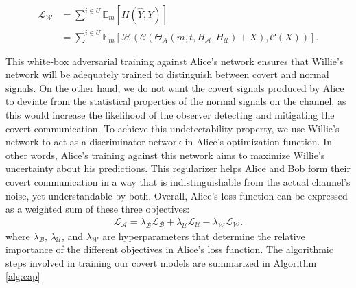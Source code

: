\begin{equation}
	\begin{aligned} \label{multi_willie_loss}
		\mathcal{L}_{\mathcal{W}} & = 
		\sum^{i \in U} \mathbb{E}_{m}[H(\hat{Y}, Y)] \\
		& = \sum^{i \in U}
			\mathbb{E}_{m}[\mathcal{H}(\mathcal{C}(\Theta_{\mathcal{A}}(m, t, H_{\mathcal{A}}, H_{\mathcal{U}}) + X), \mathcal{C}(X))].
	\end{aligned}
\end{equation}

This white-box adversarial training against Alice's network ensures that Willie's network will be adequately trained to distinguish between covert and normal signals. On the other hand, we do not want the covert signals produced by Alice to deviate from the statistical properties of the normal signals on the channel, as this would increase the likelihood of the observer detecting and mitigating the covert communication. To achieve this undetectability property, we use Willie's network to act as a discriminator network in Alice's optimization function. In other words, Alice's training against this network aims to maximize Willie's uncertainty about his predictions. This regularizer helps Alice and Bob form their covert communication in a way that is indistinguishable from the actual channel's noise, yet understandable by both. Overall, Alice's loss function can be expressed as a weighted sum of these three objectives:
\begin{equation}
	\begin{array}{l} \label{alice_loss}
	\mathcal{L}_{\mathcal{A}} = \lambda_{\mathcal{B}} \mathcal{L}_{\mathcal{B}} + \lambda_{\mathcal{U}} \mathcal{L}_{\mathcal{U}} - \lambda_{\mathcal{W}} \mathcal{L}_{\mathcal{W}}.
\end{array}
\end{equation}
where \(\lambda_{\mathcal{B}}\), \(\lambda_{\mathcal{U}}\), and \(\lambda_{\mathcal{W}}\) are hyperparameters that determine the relative importance of the different objectives in Alice's loss function. The algorithmic steps involved in training our covert models are summarized in Algorithm \ref{alg:cap}

